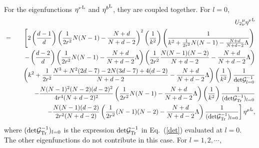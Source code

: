 \documentclass[a4paper,aps,preprint,groupedaddress,showpacs]{revtex4}
\begin{document}
For the eigenfunctions ${\eta^{\nu}}^{\rm L}$ and                                           
${\eta^{b}}^{\rm L}$, they are coupled together. For $l=0$,
\begin{eqnarray}
&&{U_{2}}^{\mu}_{\nu}{\eta^{\nu}}^{\rm L}
\nonumber\\
&=&
\left[2\left(\frac{d-1}{d}\right)
\left(\frac{1}{2r^{2}}N(N-1)-\frac{N+d}{N+d-2}\right)^{2}
\left(\frac{1}{k^{2}}\right)
\left(\frac{1}{k^{2}+\frac{1}{2r^{2}}N(N-1)-
\frac{N+d}{N+d-2}\Lambda}\right)\right.
\nonumber\\
&&\ \ -\left(\frac{d-2}{d}\right)
\left(\frac{1}{2r^{2}}N(N-1)-\frac{N+d}{N+d-2}\Lambda\right)
\left(\frac{1}{2r^{2}}\frac{N(N-1)(N-2)}{N+d-2}-
\frac{N+d}{N+d-2}\Lambda\right) 
\nonumber\\
&&\ \ \ \left(k^{2}+\frac{1}{2r^{2}}
\frac{N^{3}+N^{2}(2d-7)-2N(3d-7)+4(d-2)}{N+d-2}-
\frac{N+d}{N+d-2}\Lambda\right)
\left(\frac{1}{k^{2}}\right)\frac{1}{{\rm det}{\cal G}^{-1}_{l=0}}
\nonumber\\
&&\ \ -\frac{N(N-1)^{2}(N-2)(d-2)^{2}}{4r^{4}(N+d-2)^{2}}
\left(\frac{1}{2r^{2}}N(N-1)-
\frac{N+d}{N+d-2}\Lambda\right)
\left(\frac{1}{k^{2}}\right)\frac{1}
{({\rm det}{\cal G}^{-1}_{\rm Tr})_{l=0}}
\nonumber\\
&&\ \ \left.-\frac{N(N-1)(d-2)}{2r^{2}(N+d-2)}
\left(\frac{1}{2r^{2}}(N-1)(N-2)-
\frac{N+d}{N+d-2}\Lambda\right)
\frac{1}{({\rm det}{\cal G}^{-1}_{\rm Tr})_{l=0}}
\right]{\eta^{\mu}}^{\rm L},
\nonumber\\
\end{eqnarray}
where $({\rm det}{\cal G}^{-1}_{\rm Tr})_{l=0}$ is the 
expression ${\rm det}{\cal G}^{-1}_{\rm Tr}$ in 
Eq.~(\ref{det}) evaluated 
at $l=0$. The other eigenfunctions do not contribute in this
case. For $l=1,2,\cdots$,
\end{document}
